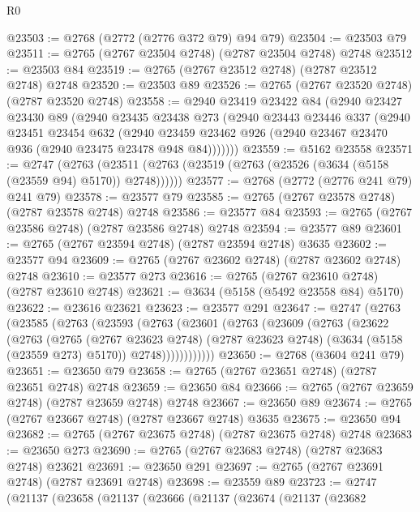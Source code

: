 \begin{lexlean}{R0}
\begin{coremodule}
@23503 := @2768 (@2772 (@2776 @372 @79) @94 @79)
@23504 := @23503 @79
@23511 := @2765 (@2767 @23504 @2748) (@2787 @23504 @2748) @2748
@23512 := @23503 @84
@23519 := @2765 (@2767 @23512 @2748) (@2787 @23512 @2748) @2748
@23520 := @23503 @89
@23526 := @2765 (@2767 @23520 @2748) (@2787 @23520 @2748)
@23558 := @2940
    @23419
    @23422
    @84
    (@2940
      @23427
      @23430
      @89
      (@2940
        @23435
        @23438
        @273
        (@2940
          @23443
          @23446
          @337
          (@2940
            @23451
            @23454
            @632
            (@2940 @23459 @23462 @926 (@2940 @23467 @23470 @936 (@2940 @23475 @23478 @948 @84)))))))
@23559 := @5162 @23558
@23571 := @2747
    (@2763 (@23511 (@2763 (@23519 (@2763 (@23526 (@3634 (@5158 (@23559 @94) @5170)) @2748))))))
@23577 := @2768 (@2772 (@2776 @241 @79) @241 @79)
@23578 := @23577 @79
@23585 := @2765 (@2767 @23578 @2748) (@2787 @23578 @2748) @2748
@23586 := @23577 @84
@23593 := @2765 (@2767 @23586 @2748) (@2787 @23586 @2748) @2748
@23594 := @23577 @89
@23601 := @2765 (@2767 @23594 @2748) (@2787 @23594 @2748) @3635
@23602 := @23577 @94
@23609 := @2765 (@2767 @23602 @2748) (@2787 @23602 @2748) @2748
@23610 := @23577 @273
@23616 := @2765 (@2767 @23610 @2748) (@2787 @23610 @2748)
@23621 := @3634 (@5158 (@5492 @23558 @84) @5170)
@23622 := @23616 @23621
@23623 := @23577 @291
@23647 := @2747
    (@2763
      (@23585
        (@2763
          (@23593
            (@2763
              (@23601
                (@2763
                  (@23609
                    (@2763
                      (@23622
                        (@2763
                          (@2765
                            (@2767 @23623 @2748)
                            (@2787 @23623 @2748)
                            (@3634 (@5158 (@23559 @273) @5170))
                            @2748))))))))))))
@23650 := @2768 (@3604 @241 @79)
@23651 := @23650 @79
@23658 := @2765 (@2767 @23651 @2748) (@2787 @23651 @2748) @2748
@23659 := @23650 @84
@23666 := @2765 (@2767 @23659 @2748) (@2787 @23659 @2748) @2748
@23667 := @23650 @89
@23674 := @2765 (@2767 @23667 @2748) (@2787 @23667 @2748) @3635
@23675 := @23650 @94
@23682 := @2765 (@2767 @23675 @2748) (@2787 @23675 @2748) @2748
@23683 := @23650 @273
@23690 := @2765 (@2767 @23683 @2748) (@2787 @23683 @2748) @23621
@23691 := @23650 @291
@23697 := @2765 (@2767 @23691 @2748) (@2787 @23691 @2748)
@23698 := @23559 @89
@23723 := @2747
    (@21137
      (@23658
        (@21137
          (@23666
            (@21137
              (@23674
                (@21137
                  (@23682

\end{coremodule}
\end{lexlean}
